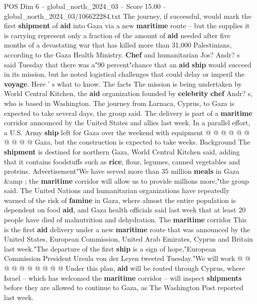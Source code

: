 \begin{textsample}{POS Dim 6 – global\_north\_2024\_03 – Score 15.00 – global\_north\_2024\_03/106622284.txt}  \label{ex:f6_pos_043}
The journey, if successful, would mark the first \textbf{shipment} of \textbf{aid} into Gaza via a new \textbf{maritime} route -- but the supplies it is carrying represent only a fraction of the amount of \textbf{aid} needed after five months of a devastating war that has killed more than 31,000 Palestinians, according to the Gaza Health Ministry. \textbf{Chef} and humanitarian Jos?
Andr? s said Tuesday that there was a"90 percent"chance that an \textbf{aid} \textbf{ship} would succeed in its mission, but he noted logistical challenges that could delay or imperil the \textbf{voyage}.
Here ' s what to know.
The facts The mission is being undertaken by World Central Kitchen, the \textbf{aid} organization founded by \textbf{celebrity} \textbf{chef} Andr? s, who is based in Washington.
The journey from Larnaca, Cyprus, to Gaza is expected to take several days, the group said.
The delivery is part of a \textbf{maritime} corridor announced by the United States and allies last week.
In a parallel effort, a U.S.
Army \textbf{ship} left for Gaza over the weekend with equipment @ @ @ @ @ @ @ @ @ @ Gaza, but the construction is expected to take weeks.
Background The \textbf{shipment} is destined for northern Gaza, World Central Kitchen said, adding that it contains foodstuffs such as \textbf{rice}, flour, legumes, canned vegetables and proteins.
Advertisement"We have served more than 35 million \textbf{meals} in Gaza \&amp ; the \textbf{maritime} corridor will allow us to provide millions more,"the group said.
The United Nations and humanitarian organizations have repeatedly warned of the risk of \textbf{famine} in Gaza, where almost the entire population is dependent on food \textbf{aid}, and Gaza health officials said last week that at least 20 people have died of malnutrition and dehydration.
The \textbf{maritime} corridor This is the first \textbf{aid} delivery under a new \textbf{maritime} route that was announced by the United States, European Commission, United Arab Emirates, Cyprus and Britain last week."The departure of the first \textbf{ship} is a sign of hope,"European Commission President Ursula von der Leyen tweeted Tuesday."We will work @ @ @ @ @ @ @ @ @ @ Under this plan, \textbf{aid} will be routed through Cyprus, where Israel -- which has welcomed the \textbf{maritime} corridor -- will inspect \textbf{shipments} before they are allowed to continue to Gaza, as The Washington Post reported last week.

\end{textsample}

